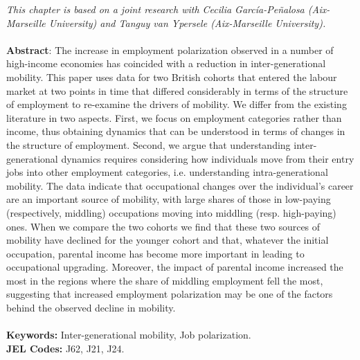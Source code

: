 \textit{This chapter is based on a joint research with Cecilia García-Peñalosa (Aix-Marseille University) and Tanguy van Ypersele (Aix-Marseille University).}\\
\vspace{1em}\\
\noindent \textbf{Abstract}: The increase in employment polarization observed in a number of high-income economies has coincided with a reduction in inter-generational mobility. This paper uses data for two British cohorts that entered the labour market at two points in time that differed considerably in terms of the structure of employment to re-examine the drivers of mobility. 
We differ from the existing literature in two aspects. First, we focus on employment categories rather than income, thus obtaining dynamics that can be understood in terms of changes in the structure of employment. Second, we argue that understanding inter-generational dynamics requires considering how individuals move from their entry jobs into other employment categories, i.e. understanding intra-generational mobility. 
The data indicate that occupational changes over the individual’s career are an important source of mobility, with large shares of those in low-paying (respectively, middling) occupations moving into middling (resp. high-paying) ones. When we compare the two cohorts we find that these two sources of mobility have declined for the younger cohort and that, whatever the initial occupation, parental income has become more important in leading to occupational upgrading. 
Moreover, the impact of parental income increased the most in the regions where the share of middling employment fell the most, suggesting that increased employment polarization may be one of the factors behind the observed decline in mobility.\\
\vspace{1em}\\
\noindent\textbf{Keywords:} Inter-generational mobility, Job polarization.\\
\noindent\textbf{JEL Codes:} J62, J21, J24.

\clearpage
\chaptertoc{}

\pagebreak


